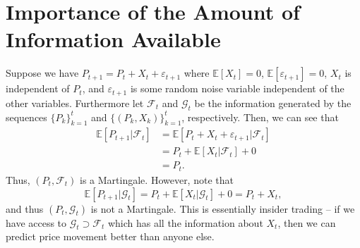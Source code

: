 \section{Importance of the Amount of Information Available}
Suppose we have $P_{t+1}=P_t+X_t+\varepsilon_{t+1}$ where $\mathbb E[X_t]=0$, $\mathbb E[\varepsilon_{t+1}]=0$, $X_t$ is independent of $P_t$, and $\varepsilon_{t+1}$ is some random noise variable independent of the other variables. Furthermore let $\mathcal F_t$ and $\mathcal G_t$ be the information generated by the sequences $\{P_k\}_{k=1}^t$ and $\{(P_k,X_k)\}_{k=1}^t$, respectively. Then, we can see that \begin{align*}
	\mathbb E[P_{t+1}|\mathcal F_t] &= \mathbb E[P_t+X_t+\varepsilon_{t+1}|\mathcal F_t] \\
									&= P_t + \mathbb E[X_t|\mathcal F_t] + 0 \\
									&= P_t.
\end{align*} Thus, $(P_t,\mathcal F_t)$ is a Martingale. However, note that $$\mathbb E[P_{t+1}|\mathcal G_t] = P_t + \mathbb E[X_t|\mathcal G_t] + 0 = P_t + X_t,$$ and thus $(P_t,\mathcal G_t)$ is not a Martingale. This is essentially insider trading -- if we have access to $\mathcal G_t\supset \mathcal F_t$ which has all the information about $X_t$, then we can predict price movement better than anyone else.

